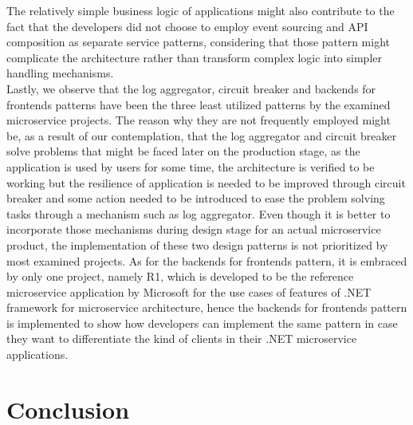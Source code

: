 \documentclass{Configuration_Files/PoliMi3i_thesis}
\begin{document}
The relatively simple business logic of applications might also contribute to the fact that the developers did not choose to employ event sourcing and API composition as separate service patterns, considering that those pattern might complicate the architecture rather than transform complex logic into simpler handling mechanisms.
\\
Lastly, we observe that the log aggregator, circuit breaker and backends for frontends patterns have been the three least utilized patterns by the examined microservice projects.
The reason why they are not frequently employed might be, as a result of our contemplation, that the log aggregator and circuit breaker solve problems that might be faced later on the production stage, as the application is used by users for some time, the architecture is verified to be working but the resilience of application is needed to be improved through circuit breaker and some action needed to be introduced to ease the problem solving tasks through a mechanism such as log aggregator.
Even though it is better to incorporate those mechanisms during design stage for an actual microservice product, the implementation of these two design patterns is not prioritized by most examined projects.
As for the backends for frontends pattern, it is embraced by only one project, namely R1, which is developed to be the reference microservice application by Microsoft for the use cases of features of .NET framework for microservice architecture, hence the backends for frontends pattern is implemented to show how developers can implement the same pattern in case they want to differentiate the kind of clients in their .NET microservice applications.



\chapter{Conclusion}
\label{ch:conclusion}%




\end{document}
